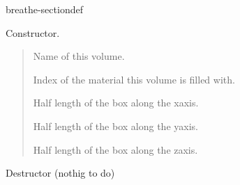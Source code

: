 \documentclass[letterpaper,10pt,english]{sphinxmanual}
\begin{document}
\begin{fulllineitems}
\begin{sphinxuseclass}{breathe-sectiondef}
\begin{fulllineitems}
\label{\detokenize{Simulation/SimulationCodeDoc:_CPPv4N3Box3BoxERKNSt6stringEiddd}}
\pysigstartsignatures
\pysigstartmultiline
{}
\pysigstopmultiline
\pysigstopsignatures
\sphinxAtStartPar
Constructor. 

\sphinxAtStartPar
\begin{quote}\begin{description}
\sphinxAtStartPar
\sphinxstylestrong{{[}in{]}} Name of this volume. 

\sphinxAtStartPar
\sphinxstylestrong{{[}in{]}} Index of the material this volume is filled with. 

\sphinxAtStartPar
\sphinxstylestrong{{[}in{]}} Half length of the box along the x\sphinxhyphen{}axis. 

\sphinxAtStartPar
\sphinxstylestrong{{[}in{]}} Half length of the box along the y\sphinxhyphen{}axis. 

\sphinxAtStartPar
\sphinxstylestrong{{[}in{]}} Half length of the box along the z\sphinxhyphen{}axis. 

\end{description}\end{quote}


\end{fulllineitems}


\begin{fulllineitems}
\label{\detokenize{Simulation/SimulationCodeDoc:_CPPv4N3BoxD0Ev}}
\pysigstartsignatures
\pysigstartmultiline
{}
\pysigstopmultiline
\pysigstopsignatures
\sphinxAtStartPar
Destructor (nothig to do) 


\end{fulllineitems}
\end{sphinxuseclass}
\end{fulllineitems}
\end{document}
